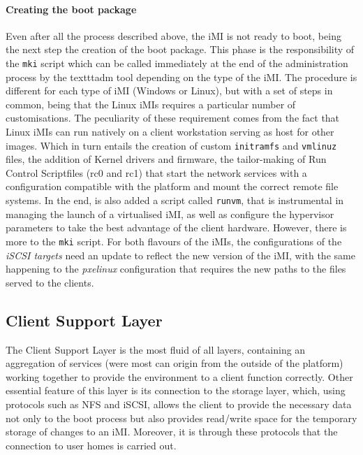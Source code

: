 
\paragraph{Creating the boot package}
\label{par:icbd_create_bootpack}
Even after all the process described above, the iMI is not ready to boot, being the next step the creation of the boot package. This phase is the responsibility of the \texttt{mki} script which can be called immediately at the end of the administration process by the texttt{adm} tool depending on the type of the iMI.
The procedure is different for each type of iMI (Windows or Linux), but with a set of steps in common, being that the Linux iMIs requires a particular number of customisations. The peculiarity of these requirement comes from the fact that Linux iMIs can run natively on a client workstation serving as host for other images. Which in turn entails the creation of custom \texttt{initramfs} and \texttt{vmlinuz} files, the addition of Kernel drivers and firmware, the tailor-making of Run Control Scriptfiles (rc0 and rc1) that start the network services with a configuration compatible with the platform and mount the correct remote file systems. In the end, is also added a script called \texttt{runvm}, that is instrumental in managing the launch of a virtualised iMI, as well as configure the hypervisor parameters to take the best advantage of the client hardware.
However, there is more to the \texttt{mki} script. For both flavours of the iMIs, the configurations of the \textit{iSCSI targets} need an update to reflect the new version of the iMI, with the same happening to the \textit{pxelinux} configuration that requires the new paths to the files served to the clients.


\subsection{Client Support Layer}
\label{sub:icbd_client_support_layer}

The Client Support Layer is the most fluid of all layers, containing an aggregation of services (were most can origin from the outside of the platform) working together to provide the environment to a client function correctly.
Other essential feature of this layer is its connection to the storage layer, which, using protocols such as NFS and iSCSI, allows the client to provide the necessary data not only to the boot process but also provides read/write space for the temporary storage of changes to an iMI. Moreover, it is through these protocols that the connection to user homes is carried out.


